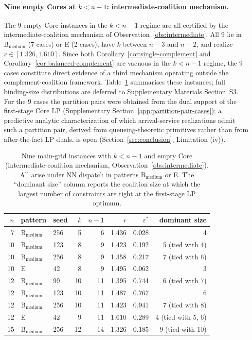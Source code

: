 \documentclass[11pt]{article}
\theoremstyle{plain}
\theoremstyle{definition}
\theoremstyle{remark}
\begin{document}
\paragraph{Nine empty Cores at $k<n-1$: intermediate-coalition mechanism.} The 9 empty-Core instances in the $k<n-1$ regime are all certified by the intermediate-coalition mechanism of Observation~\ref{obs:intermediate}. All 9 lie in $\text{B}_{\text{medium}}$ (7 cases) or E (2 cases), have $k$ between $n-3$ and $n-2$, and realize $r\in[1.326,1.610]$. Since both Corollary~\ref{cor:single-complement} and Corollary~\ref{cor:balanced-complement} are vacuous in the $k<n-1$ regime, the 9 cases constitute direct evidence of a third mechanism operating outside the complement-coalition framework. Table~\ref{tab:intermediate} summarises these instances; full binding-size distributions are deferred to Supplementary Materials Section~S3. For the 9 cases the partition pairs were obtained from the dual support of the first-stage Core LP (Supplementary Section~\ref{app:partition-pair-cases}); a predictive analytic characterization of which arrival-service realizations admit such a partition pair, derived from queueing-theoretic primitives rather than from after-the-fact LP duals, is open (Section~\ref{sec:conclusion}, Limitation (iv)).

\begin{table}[h]
\centering
\small
\caption{Nine main-grid instances with $k<n-1$ and empty Core (intermediate-coalition mechanism, Observation~\ref{obs:intermediate}). All arise under NN dispatch in patterns $\text{B}_{\text{medium}}$ or E. The ``dominant size'' column reports the coalition size at which the largest number of constraints are tight at the first-stage LP optimum.}
\label{tab:intermediate}
\begin{tabular}{@{}rllrrrrr@{}}
\toprule
$n$ & pattern & seed & $k$ & $n-1$ & $r$ & $\varepsilon^{\ast}$ & dominant size \\
\midrule
 7 & $\text{B}_{\text{medium}}$ & 256 &  5 &  6 & 1.436 & 0.028 & 4 \\
10 & $\text{B}_{\text{medium}}$ & 123 &  8 &  9 & 1.423 & 0.192 & 5 (tied with 4) \\
10 & $\text{B}_{\text{medium}}$ & 256 &  8 &  9 & 1.358 & 0.217 & 7 (tied with 6) \\
10 & E                          &  42 &  8 &  9 & 1.495 & 0.062 & 3 \\
12 & $\text{B}_{\text{medium}}$ &  99 & 10 & 11 & 1.395 & 0.744 & 6 (tied with 7) \\
12 & $\text{B}_{\text{medium}}$ & 123 & 10 & 11 & 1.487 & 0.767 & 6 \\
12 & $\text{B}_{\text{medium}}$ & 256 & 10 & 11 & 1.423 & 0.941 & 7 (tied with 8) \\
12 & E                          &  42 &  9 & 11 & 1.610 & 0.289 & 4 (tied with 5, 6) \\
15 & $\text{B}_{\text{medium}}$ & 256 & 12 & 14 & 1.326 & 0.185 & 9 (tied with 10) \\
\bottomrule
\end{tabular}
\end{table}
\end{document}
